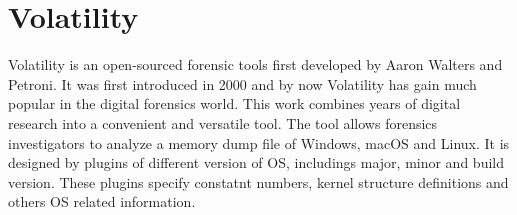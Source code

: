 \section[Volatility]{Volatility}

Volatility is an open-sourced forensic tools first developed by Aaron Walters and Petroni. It was first introduced in 2000 and by now Volatility has gain much popular in the digital forensics world. This work combines years of digital research into a convenient and versatile tool. The tool allows forensics investigators to analyze a memory dump file of Windows, macOS and Linux. It is designed by plugins of different version of OS, includings major, minor and build version. These plugins specify constatnt numbers, kernel structure definitions and others OS related information.


